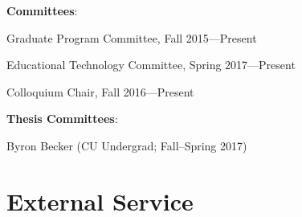 \documentclass[10pt,letterpaper]{article}
\newcommand{\ReviewItem}[1]{\item #1}
\newcommand{\ReviewItemsBegin}{\begin{itemize}}
\newcommand{\ReviewItemsEnd}{\end{itemize}}
\renewenvironment{itemize}{
  \begin{list}{}{
    \setlength{\leftmargin}{1.5em}
    \setlength{\itemsep}{0.25em}
    \setlength{\parskip}{0pt}
    \setlength{\parsep}{0.25em}
  }
}{
  \end{list}
}
\begin{document}
\begin{itemize}

\item \textbf{Committees}:
\ReviewItemsBegin
\ReviewItem{ Graduate Program Committee, Fall 2015---Present}
\ReviewItem{ Educational Technology Committee, Spring 2017---Present}
\ReviewItemsEnd

\item Colloquium Chair, Fall 2016---Present

\item \textbf{Thesis Committees}:
\ReviewItemsBegin
\ReviewItem{ Byron Becker (CU Undergrad; Fall--Spring 2017) }
\ReviewItemsEnd

\end{itemize}

\section*{External Service}
\end{document}
